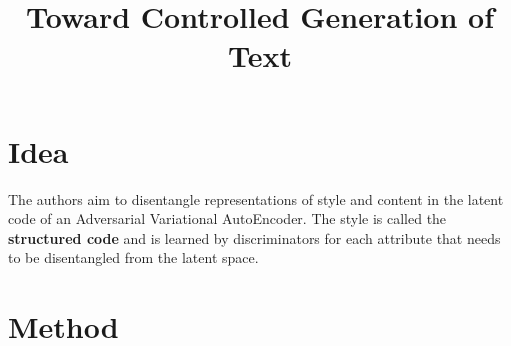 \documentclass[12pt]{article}
\begin{document}
\title{Toward Controlled Generation of Text}
\author{}
\date{}
\maketitle

\section{Idea}
  The authors aim to disentangle representations of style and content in the latent code of an Adversarial Variational AutoEncoder. The style is called the \textbf{structured code} and is learned by discriminators for each attribute that needs to be disentangled from the latent space.

\section{Method}
\end{document}
